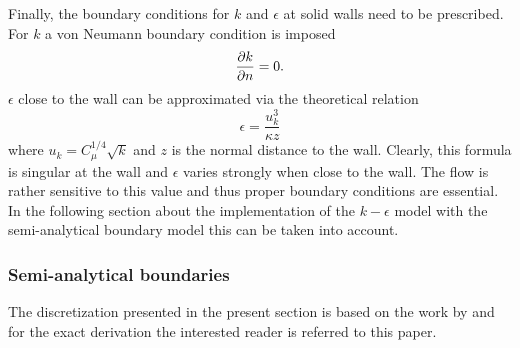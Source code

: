 \documentclass{../GPUSPHtemplate}
\begin{document}
Finally, the boundary conditions for $k$ and $\epsilon$ at solid walls
need to be prescribed. For $k$ a von Neumann boundary condition is
imposed
\begin{equation}
\frac{\partial k}{\partial n} = 0.
\label{e:turb:k-bound}
\end{equation}
$\epsilon$ close to the wall can be approximated via the theoretical
relation
\begin{equation}
\epsilon = \frac{u_k^3}{\kappa z}
\label{e:turb:eps-nearwall}
\end{equation}
where $u_k = C_\mu^{1/4} \sqrt{k}$ and $z$ is the normal distance to the
wall. Clearly, this formula is singular at the wall and $\epsilon$
varies strongly when close to the wall. The flow is rather sensitive to
this value and thus proper boundary conditions are essential. In the
following section about the implementation of the $k-\epsilon$ model
with the semi-analytical boundary model this can be taken into account.

\subsubsection{Semi-analytical boundaries}
The discretization presented in the present section is based on the work
by \cite{leroy_unified_2014} and for the exact derivation the interested
reader is referred to this paper.
\end{document}
